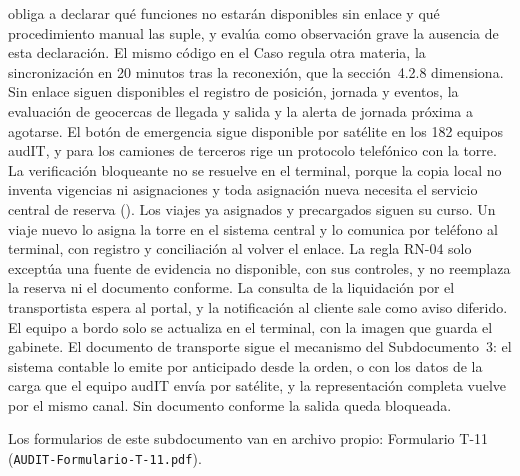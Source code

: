  obliga a declarar qué funciones no estarán disponibles sin enlace y qué
procedimiento manual las suple, y evalúa como observación grave la ausencia de esta declaración. El
mismo código en el Caso regula otra materia, la sincronización en 20 minutos tras la reconexión, que la
sección~4.2.8 dimensiona. Sin enlace
siguen disponibles el registro de posición, jornada y eventos, la evaluación de geocercas de llegada y
salida y la alerta de jornada próxima a agotarse. El botón de emergencia sigue disponible por satélite
en los 182 equipos audIT, y para los camiones de terceros rige un protocolo telefónico con la torre. La
verificación bloqueante no se resuelve en el terminal, porque la copia local no inventa vigencias ni
asignaciones y toda asignación nueva necesita el servicio central de reserva
(). Los viajes ya asignados y precargados siguen su curso. Un viaje
nuevo lo asigna la torre en el sistema central y lo comunica por teléfono al terminal, con registro y
conciliación al volver el enlace. La regla RN-04 solo exceptúa una fuente de evidencia no disponible,
con sus controles, y no reemplaza la reserva ni el documento conforme. La consulta de la
liquidación por el transportista espera al portal, y la notificación al cliente sale como aviso
diferido. El equipo a bordo solo se actualiza en el terminal, con la imagen que guarda el gabinete. El
documento de transporte sigue el mecanismo del Subdocumento~3: el sistema contable lo emite por
anticipado desde la orden, o con los datos de la carga que el equipo audIT envía por satélite, y la
representación completa vuelve por el mismo canal. Sin documento conforme la salida queda bloqueada.

Los formularios de este subdocumento van en archivo propio: Formulario T-11 (\texttt{AUDIT-Formulario-T-11.pdf}).
